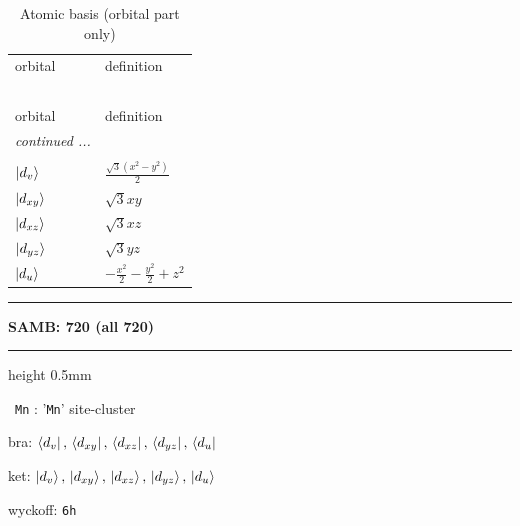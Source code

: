 \documentclass[fleqn,10pt,landscape]{jsarticle}
\begin{document}
\renewcommand{\arraystretch}{1.6}
\begin{longtable}[l]{ll}
\captionsetup{justification=raggedright, singlelinecheck=off}
\caption{Atomic basis (orbital part only)}
 \\
 \hline \hline
orbital & definition \\ \hline \endfirsthead

\multicolumn{1}{l}{\tablename\ \thetable{}} \\
 \hline \hline
orbital & definition \\ \hline \endhead

 \hline \hline
\multicolumn{1}{r}{\footnotesize\it continued ...} \\ \endfoot

 \hline \hline
\multicolumn{1}{r}{} \\ \endlastfoot

$ \ket{d_{v}} $ & $ \frac{\sqrt{3} \left(x^{2} - y^{2}\right)}{2} $ \\
$ \ket{d_{xy}} $ & $ \sqrt{3} x y $ \\
$ \ket{d_{xz}} $ & $ \sqrt{3} x z $ \\
$ \ket{d_{yz}} $ & $ \sqrt{3} y z $ \\
$ \ket{d_{u}} $ & $ - \frac{x^{2}}{2} - \frac{y^{2}}{2} + z^{2} $ \\
\end{longtable}
\vspace{5mm}
\noindent \rule[0.5mm]{5mm}{0.5mm}\hspace{3mm}\textbf{SAMB: 720 (all 720)}\hspace{3mm}\leaders\hrule height 0.5mm\hfill\kern0pt
\vspace{3mm}

\vspace{5mm}

\noindent\textbullet\, \texttt{Mn} : '\texttt{Mn}' site-cluster

\noindent\quad * bra: $\bra{d_{v}},\, \bra{d_{xy}},\, \bra{d_{xz}},\, \bra{d_{yz}},\, \bra{d_{u}}$

\noindent\quad * ket: $\ket{d_{v}},\, \ket{d_{xy}},\, \ket{d_{xz}},\, \ket{d_{yz}},\, \ket{d_{u}}$

\noindent\quad * wyckoff: \texttt{6h}
\end{document}
